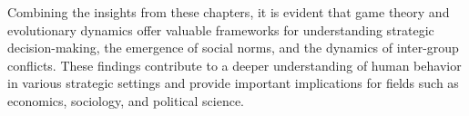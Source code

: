 Combining the insights from these chapters, it is evident that game theory and evolutionary dynamics offer valuable frameworks for understanding strategic decision-making, the emergence of social norms, and the dynamics of inter-group conflicts. These findings contribute to a deeper understanding of human behavior in various strategic settings and provide important implications for fields such as economics, sociology, and political science.



